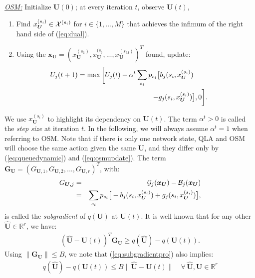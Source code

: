 \documentclass[journal]{IEEEtran}
\newcommand{\bv}[1]{{\boldsymbol{#1} }}
\newcommand{\script}[1]{{{\cal{#1} }}}
\begin{document}
\underline{\emph{OSM:}} Initialize $\bv{U}(0)$; at every iteration $t$, observe $\bv{U}(t)$, 
\begin{enumerate}
\item Find $x_{\bv{U}}^{(s_i)}\in\script{X}^{(s_i)}$ for $i\in\{1, ..., M\}$ that achieves the infimum of the right hand side of (\ref{eq:dual}). %
\item Using the $\bv{x}_{\bv{U}}=(x_{\bv{U}}^{(s_1)}, x_{\bv{U}}^{(s_)}, ..., x_{\bv{U}}^{(s_M)})^T$ found, update: 
\begin{eqnarray}
\hspace{-.3in}U_j(t+1)=\max\bigg[U_j(t)-\alpha^t\sum_{s_i}p_{s_i}\big[b_j(s_i, x_{\bv{U}}^{(s_i)})\label{eq:osmupdate}\qquad\\
-g_j(s_i, x_{\bv{U}}^{(s_i)})\big],0\bigg].\nonumber
\end{eqnarray}
\end{enumerate}
We use $x^{(s_i)}_\bv{U}$ to highlight its dependency on $\bv{U}(t)$. The term $\alpha^t>0$ is called the \emph{step size} at iteration $t$. In the following, we will always assume $\alpha^t=1$ when referring to OSM. Note that if there is only one network state, QLA and OSM will choose the same action given the same $\bv{U}$, and they differ only by (\ref{eq:queuedynamic}) and (\ref{eq:osmupdate}). The term $\bv{G}_{\bv{U}}=(G_{\bv{U},1}, G_{\bv{U},2}, ..., G_{\bv{U},r})^{T}$,  with: 
\begin{eqnarray}
G_{\bv{U},j}&=&\script{G}_j(\bv{x}_{\bv{U}})-\script{B}_j(\bv{x}_{\bv{U}})\label{eq:subgradient_def}\\
&=&\sum_{s_i}p_{s_i}\big[-b_j(s_i, x_{\bv{U}}^{(s_i)})+ g_j(s_i, x_{\bv{U}}^{(s_i)})\big],\nonumber
\end{eqnarray}
is called the \emph{subgradient} of $q(\bv{U})$ at $\bv{U}(t)$. It is well known that for any other $\hat{\bv{U}}\in\mathbb{R}^r$, we have:
\begin{eqnarray}
(\hat{\bv{U}}-\bv{U}(t))^{T}\bv{G}_{\bv{U}}\geq q(\hat{\bv{U}})-q(\bv{U}(t)).\label{eq:subgradientpro}
\end{eqnarray}
Using $\|\bv{G}_{\bv{U}}\|\leq B$, we note that (\ref{eq:subgradientpro}) also implies:
\begin{eqnarray}
q(\hat{\bv{U}})-q(\bv{U}(t))\leq B\|\hat{\bv{U}}-\bv{U}(t)\|\quad\forall\,\hat{\bv{U}}, \bv{U}\in\mathbb{R}^r\label{eq:dualbddslope}
\end{eqnarray}
 
\end{document}
